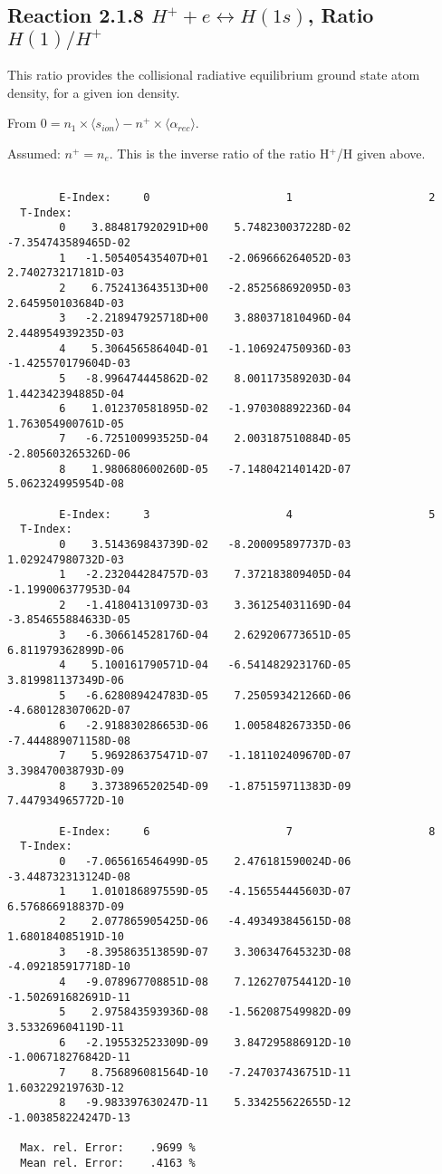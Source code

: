 \documentclass[12pt,dvipdfmx]{article}
\begin{document}
\subsection{
Reaction 2.1.8   $H^+ + e \leftrightarrow H(1s) $,  Ratio $H(1)/H^+$
}
This ratio provides the collisional radiative equilibrium ground state
atom density, for a given ion density.

From $0 = n_1 \times  \langle s_{ion} \rangle - n^+ \times \langle\alpha_{rec} \rangle$.

Assumed:  $n^+ = n_e$. This is the inverse ratio of the ratio H$^+$/H given
above.
\begin{small}\begin{verbatim}

        E-Index:     0                     1                     2
  T-Index:
        0    3.884817920291D+00    5.748230037228D-02   -7.354743589465D-02
        1   -1.505405435407D+01   -2.069666264052D-03    2.740273217181D-03
        2    6.752413643513D+00   -2.852568692095D-03    2.645950103684D-03
        3   -2.218947925718D+00    3.880371810496D-04    2.448954939235D-03
        4    5.306456586404D-01   -1.106924750936D-03   -1.425570179604D-03
        5   -8.996474445862D-02    8.001173589203D-04    1.442342394885D-04
        6    1.012370581895D-02   -1.970308892236D-04    1.763054900761D-05
        7   -6.725100993525D-04    2.003187510884D-05   -2.805603265326D-06
        8    1.980680600260D-05   -7.148042140142D-07    5.062324995954D-08

        E-Index:     3                     4                     5
  T-Index:
        0    3.514369843739D-02   -8.200095897737D-03    1.029247980732D-03
        1   -2.232044284757D-03    7.372183809405D-04   -1.199006377953D-04
        2   -1.418041310973D-03    3.361254031169D-04   -3.854655884633D-05
        3   -6.306614528176D-04    2.629206773651D-05    6.811979362899D-06
        4    5.100161790571D-04   -6.541482923176D-05    3.819981137349D-06
        5   -6.628089424783D-05    7.250593421266D-06   -4.680128307062D-07
        6   -2.918830286653D-06    1.005848267335D-06   -7.444889071158D-08
        7    5.969286375471D-07   -1.181102409670D-07    3.398470038793D-09
        8    3.373896520254D-09   -1.875159711383D-09    7.447934965772D-10

        E-Index:     6                     7                     8
  T-Index:
        0   -7.065616546499D-05    2.476181590024D-06   -3.448732313124D-08
        1    1.010186897559D-05   -4.156554445603D-07    6.576866918837D-09
        2    2.077865905425D-06   -4.493493845615D-08    1.680184085191D-10
        3   -8.395863513859D-07    3.306347645323D-08   -4.092185917718D-10
        4   -9.078967708851D-08    7.126270754412D-10   -1.502691682691D-11
        5    2.975843593936D-08   -1.562087549982D-09    3.533269604119D-11
        6   -2.195532523309D-09    3.847295886912D-10   -1.006718276842D-11
        7    8.756896081564D-10   -7.247037436751D-11    1.603229219763D-12
        8   -9.983397630247D-11    5.334255622655D-12   -1.003858224247D-13

  Max. rel. Error:    .9699 %
  Mean rel. Error:    .4163 %


\end{verbatim}\end{small}
\end{document}

